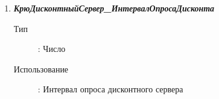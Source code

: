 \begin{enumerate}[label=(\arabic*)]
\vspace{\baselineskip}
\item \textbf{\textit{КрюДисконтныйСервер\_ИнтервалОпросаДисконта}}
\begin{description}
    \item[Тип] : Число
    \item[Использование]: Интервал опроса дисконтного сервера
\end{description}





\end{enumerate}

